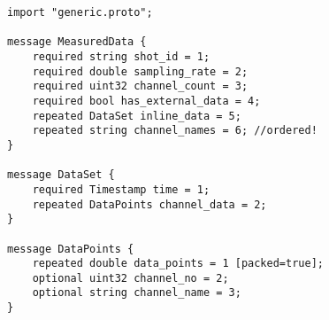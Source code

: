 \begin{Verbatim}[baselinestretch=1,fontsize=\scriptsize]
import "generic.proto";

message MeasuredData {
    required string shot_id = 1;
    required double sampling_rate = 2;
    required uint32 channel_count = 3;
    required bool has_external_data = 4;
    repeated DataSet inline_data = 5;
    repeated string channel_names = 6; //ordered!
}

message DataSet {
    required Timestamp time = 1;
    repeated DataPoints channel_data = 2;
}

message DataPoints {
    repeated double data_points = 1 [packed=true];
    optional uint32 channel_no = 2;
    optional string channel_name = 3;
}
\end{Verbatim}

